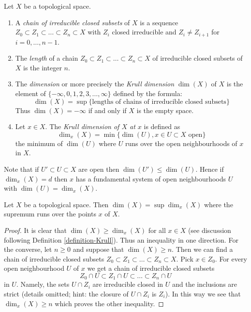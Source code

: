 \begin{definition}
\label{definition-Krull}
Let $X$ be a topological space.
\begin{enumerate}
\item A {\it chain of irreducible closed subsets} of $X$
is a sequence $Z_0 \subset Z_1 \subset \ldots \subset Z_n \subset X$
with $Z_i$ closed irreducible and $Z_i \not = Z_{i + 1}$ for
$i = 0, \ldots, n - 1$.
\item The {\it length} of a chain
$Z_0 \subset Z_1 \subset \ldots \subset Z_n \subset X$
of irreducible closed subsets of $X$ is the
integer $n$.
\item The {\it dimension} or more precisely the {\it Krull dimension}
$\dim(X)$ of $X$ is the element of
$\{-\infty, 0, 1, 2, 3, \ldots, \infty\}$ defined by the formula:
$$
\dim(X) =
\sup \{\text{lengths of chains of irreducible closed subsets}\}
$$
Thus $\dim(X) = -\infty$ if and only if $X$ is the empty space.
\item Let $x \in X$.
The {\it Krull dimension of $X$ at $x$} is defined as
$$
\dim_x(X) = \min \{\dim(U), x\in U\subset X\text{ open}\}
$$
the minimum of $\dim(U)$ where $U$ runs over the open
neighbourhoods of $x$ in $X$.
\end{enumerate}
\end{definition}

\noindent
Note that if $U' \subset U \subset X$ are open then
$\dim(U') \leq \dim(U)$. Hence if $\dim_x(X) = d$ then $x$
has a fundamental system of open neighbourhoods $U$ with
$\dim(U) = \dim_x(X)$.

\begin{lemma}
\label{lemma-dimension-supremum-local-dimensions}
Let $X$ be a topological space. Then $\dim(X) = \sup \dim_x(X)$
where the supremum runs over the points $x$ of $X$.
\end{lemma}

\begin{proof}
It is clear that $\dim(X) \geq \dim_x(X)$ for all $x \in X$ (see
discussion following Definition \ref{definition-Krull}).
Thus an inequality in one direction. For the converse, let $n \geq 0$
and suppose that $\dim(X) \geq n$. Then we can find a chain of irreducible
closed subsets $Z_0 \subset Z_1 \subset \ldots \subset Z_n \subset X$.
Pick $x \in Z_0$. For every open neighbourhood $U$ of $x$ we get
a chain of irreducible closed subsets
$$
Z_0 \cap U \subset Z_1 \cap U \subset \ldots \subset Z_n \cap U
$$
in $U$. Namely, the sets $U \cap Z_i$ are irreducible closed in $U$ and the
inclusions are strict (details omitted; hint: the closure of $U \cap Z_i$
is $Z_i$).
In this way we see that $\dim_x(X) \geq n$ which proves the other
inequality.
\end{proof}

